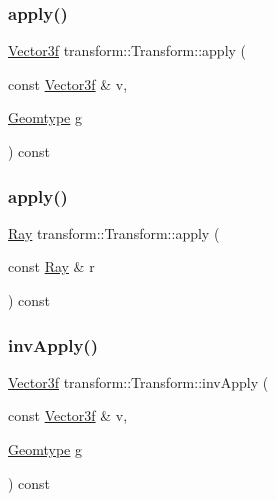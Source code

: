 \subsubsection{\texorpdfstring{apply()}{apply()}\hspace{0.1cm}{\footnotesize\ttfamily [1/2]}}
{\footnotesize\ttfamily \mbox{\hyperlink{cyclop_8hpp_a5a0a2e85b081623ef3f7e7e8d43024f5}{Vector3f}} transform\+::\+Transform\+::apply (\begin{DoxyParamCaption}\item[{const \mbox{\hyperlink{cyclop_8hpp_a5a0a2e85b081623ef3f7e7e8d43024f5}{Vector3f}} \&}]{v,  }\item[{\mbox{\hyperlink{cyclop_8hpp_a2317999143a1598860004551163419b5}{Geomtype}}}]{g }\end{DoxyParamCaption}) const}

\mbox{\label{classtransform_1_1Transform_a287e03fb3af3a5b8cdb8ecf060bae307}} 
\subsubsection{\texorpdfstring{apply()}{apply()}\hspace{0.1cm}{\footnotesize\ttfamily [2/2]}}
{\footnotesize\ttfamily \mbox{\hyperlink{classRay}{Ray}} transform\+::\+Transform\+::apply (\begin{DoxyParamCaption}\item[{const \mbox{\hyperlink{classRay}{Ray}} \&}]{r }\end{DoxyParamCaption}) const}

\mbox{\label{classtransform_1_1Transform_acd9d4c88abc5fedf91e3ef78150fee87}} 
\subsubsection{\texorpdfstring{invApply()}{invApply()}\hspace{0.1cm}{\footnotesize\ttfamily [1/2]}}
{\footnotesize\ttfamily \mbox{\hyperlink{cyclop_8hpp_a5a0a2e85b081623ef3f7e7e8d43024f5}{Vector3f}} transform\+::\+Transform\+::inv\+Apply (\begin{DoxyParamCaption}\item[{const \mbox{\hyperlink{cyclop_8hpp_a5a0a2e85b081623ef3f7e7e8d43024f5}{Vector3f}} \&}]{v,  }\item[{\mbox{\hyperlink{cyclop_8hpp_a2317999143a1598860004551163419b5}{Geomtype}}}]{g }\end{DoxyParamCaption}) const}

